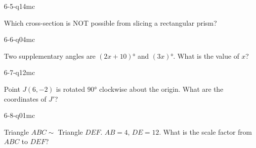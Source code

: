 \begin{practiceQuestion}{6-5-q14}{mc}
\begin{questionText}
Which cross-section is NOT possible from slicing a rectangular prism?
\end{questionText}
\end{practiceQuestion}

\begin{practiceQuestion}{6-6-q04}{mc}
\begin{questionText}
Two supplementary angles are $(2x + 10)°$ and $(3x)°$. What is the value of $x$?
\end{questionText}
\end{practiceQuestion}

\begin{practiceQuestion}{6-7-q12}{mc}
\begin{questionText}
Point $J(6, -2)$ is rotated $90°$ clockwise about the origin. What are the coordinates of $J'$?
\end{questionText}
\end{practiceQuestion}

\begin{practiceQuestion}{6-8-q01}{mc}
\begin{questionText}
Triangle $ABC \sim$ Triangle $DEF$. $AB = 4$, $DE = 12$. What is the scale factor from $ABC$ to $DEF$?
\end{questionText}
\end{practiceQuestion}

